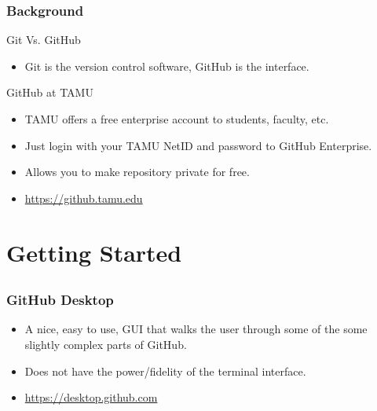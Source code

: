 \documentclass[]{beamer}
\begin{document}
\begin{frame}[t]\frametitle{Background}
  \begin{block}{Git Vs. GitHub}
    \begin{itemize}
      \item Git is the version control software, GitHub is the interface.
    \end{itemize}
  \end{block}
  \begin{block}{GitHub at TAMU}
  \begin{itemize}
    \item TAMU offers a free enterprise account to students, faculty, etc.
    \item Just login with your TAMU NetID and password to GitHub Enterprise.
    \item Allows you to make repository private for free.
    \item \url{https://github.tamu.edu}
  \end{itemize}
\end{block}
\end{frame}

\section{Getting Started}
\subsection{}

\begin{frame}[t]\frametitle{GitHub Desktop}
\begin{block}{}
\begin{itemize}
  \item A nice, easy to use, GUI that walks the user through some of the some slightly complex parts of GitHub.
  \item Does not have the power/fidelity of the terminal interface.
  \item \url{https://desktop.github.com}
\end{itemize}
\end{block}
\end{frame}
\end{document}
